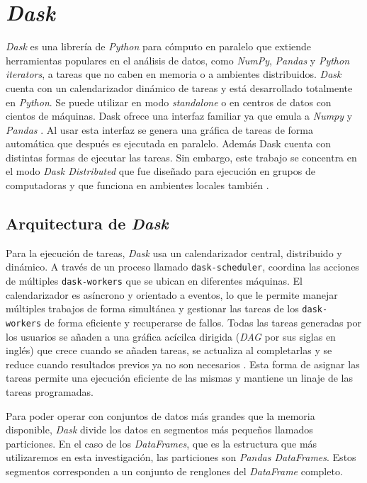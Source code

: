 \section{\textit{Dask}}

\textit{Dask} es una librería de \textit{Python} para cómputo en paralelo que extiende herramientas populares en el análisis de datos, como \textit{NumPy}, \textit{Pandas} y \textit{Python iterators}, a tareas que no caben en memoria o a ambientes distribuidos. \textit{Dask} cuenta con un calendarizador dinámico de tareas y está desarrollado totalmente en \textit{Python}. Se puede utilizar en modo \textit{standalone} o en centros de datos con cientos de máquinas. Dask ofrece una interfaz familiar ya que emula a \textit{Numpy} y \textit{Pandas} \cite{daskdocs}. Al usar esta interfaz se genera una gráfica de tareas de forma automática que después es ejecutada en paralelo. Además Dask cuenta con distintas formas de ejecutar las tareas. Sin embargo, este trabajo se concentra en el modo \textit{Dask Distributed} que fue diseñado para ejecución en grupos de computadoras y que funciona en ambientes locales también \cite{daskscheduling}.

\subsection{Arquitectura de \textit{Dask}}

Para la ejecución de tareas, \textit{Dask} usa un calendarizador central, distribuido y dinámico. A través de un proceso llamado \texttt{dask-scheduler}, coordina las acciones de múltiples \texttt{dask-workers} que se ubican en diferentes máquinas. El calendarizador es asíncrono y orientado a eventos, lo que le permite manejar múltiples trabajos de forma simultánea y gestionar las tareas de los \texttt{dask-workers} de forma eficiente y recuperarse de fallos. Todas las tareas generadas por los usuarios se añaden a una gráfica acícilca dirigida (\textit{DAG} por sus siglas en inglés) que crece cuando se añaden tareas, se actualiza al completarlas y se reduce cuando resultados previos ya no son necesarios \cite{daskdistributed}. Esta forma de asignar las tareas permite una ejecución eficiente de las mismas y mantiene un linaje de las tareas programadas.

Para poder operar con conjuntos de datos más grandes que la memoria disponible, \textit{Dask} divide los datos en segmentos más pequeños llamados particiones. En el caso de los \textit{DataFrames}, que es la estructura que más utilizaremos en esta investigación, las particiones son \textit{Pandas DataFrames}. Estos segmentos corresponden a un conjunto de renglones del \textit{DataFrame} completo.


